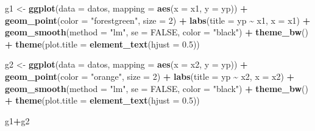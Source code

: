 \documentclass[
]{book}
\newenvironment{Shaded}{\begin{snugshade}}{\end{snugshade}}
\newcommand{\AttributeTok}[1]{\textcolor[rgb]{0.13,0.29,0.53}{#1}}
\newcommand{\ConstantTok}[1]{\textcolor[rgb]{0.56,0.35,0.01}{#1}}
\newcommand{\DecValTok}[1]{\textcolor[rgb]{0.00,0.00,0.81}{#1}}
\newcommand{\FloatTok}[1]{\textcolor[rgb]{0.00,0.00,0.81}{#1}}
\newcommand{\FunctionTok}[1]{\textcolor[rgb]{0.13,0.29,0.53}{\textbf{#1}}}
\newcommand{\NormalTok}[1]{#1}
\newcommand{\OtherTok}[1]{\textcolor[rgb]{0.56,0.35,0.01}{#1}}
\newcommand{\SpecialCharTok}[1]{\textcolor[rgb]{0.81,0.36,0.00}{\textbf{#1}}}
\newcommand{\StringTok}[1]{\textcolor[rgb]{0.31,0.60,0.02}{#1}}
\begin{document}
\begin{Shaded}
\begin{Highlighting}[]
\NormalTok{g1 }\OtherTok{\textless{}{-}} \FunctionTok{ggplot}\NormalTok{(}\AttributeTok{data =}\NormalTok{ datos, }\AttributeTok{mapping =} \FunctionTok{aes}\NormalTok{(}\AttributeTok{x =}\NormalTok{ x1, }\AttributeTok{y =}\NormalTok{ yp)) }\SpecialCharTok{+}
  \FunctionTok{geom\_point}\NormalTok{(}\AttributeTok{color =} \StringTok{"forestgreen"}\NormalTok{, }\AttributeTok{size =} \DecValTok{2}\NormalTok{) }\SpecialCharTok{+}
  \FunctionTok{labs}\NormalTok{(}\AttributeTok{title  =}  \StringTok{\textquotesingle{}yp \textasciitilde{} x1\textquotesingle{}}\NormalTok{, }\AttributeTok{x  =}  \StringTok{\textquotesingle{}x1\textquotesingle{}}\NormalTok{) }\SpecialCharTok{+}
  \FunctionTok{geom\_smooth}\NormalTok{(}\AttributeTok{method =} \StringTok{"lm"}\NormalTok{, }\AttributeTok{se =} \ConstantTok{FALSE}\NormalTok{, }\AttributeTok{color =} \StringTok{"black"}\NormalTok{) }\SpecialCharTok{+}
  \FunctionTok{theme\_bw}\NormalTok{() }\SpecialCharTok{+}
  \FunctionTok{theme}\NormalTok{(}\AttributeTok{plot.title =} \FunctionTok{element\_text}\NormalTok{(}\AttributeTok{hjust =} \FloatTok{0.5}\NormalTok{)) }

\NormalTok{g2 }\OtherTok{\textless{}{-}} \FunctionTok{ggplot}\NormalTok{(}\AttributeTok{data =}\NormalTok{ datos, }\AttributeTok{mapping =} \FunctionTok{aes}\NormalTok{(}\AttributeTok{x =}\NormalTok{ x2, }\AttributeTok{y =}\NormalTok{ yp)) }\SpecialCharTok{+}
  \FunctionTok{geom\_point}\NormalTok{(}\AttributeTok{color =} \StringTok{"orange"}\NormalTok{, }\AttributeTok{size =} \DecValTok{2}\NormalTok{) }\SpecialCharTok{+}
  \FunctionTok{labs}\NormalTok{(}\AttributeTok{title  =}  \StringTok{\textquotesingle{}yp \textasciitilde{} x2\textquotesingle{}}\NormalTok{, }\AttributeTok{x  =}  \StringTok{\textquotesingle{}x2\textquotesingle{}}\NormalTok{) }\SpecialCharTok{+}
  \FunctionTok{geom\_smooth}\NormalTok{(}\AttributeTok{method =} \StringTok{"lm"}\NormalTok{, }\AttributeTok{se =} \ConstantTok{FALSE}\NormalTok{, }\AttributeTok{color =} \StringTok{"black"}\NormalTok{) }\SpecialCharTok{+}
  \FunctionTok{theme\_bw}\NormalTok{() }\SpecialCharTok{+}
  \FunctionTok{theme}\NormalTok{(}\AttributeTok{plot.title =} \FunctionTok{element\_text}\NormalTok{(}\AttributeTok{hjust =} \FloatTok{0.5}\NormalTok{))}

\NormalTok{g1}\SpecialCharTok{+}\NormalTok{g2}
\end{Highlighting}
\end{Shaded}
\end{document}
